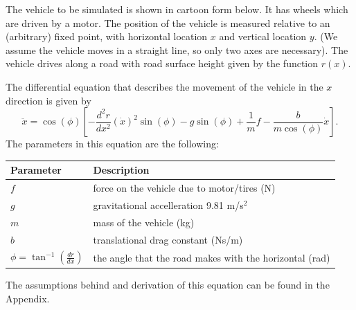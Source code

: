 The vehicle to be simulated is shown in cartoon form below. It has wheels which are driven by a motor.  The position of the vehicle is measured relative to an (arbitrary) fixed point, with horizontal location $x$ and vertical location $y$. (We assume the vehicle moves in a straight line, so only two axes are necessary).  The vehicle drives along a road with road surface height given by the function $r(x)$. 

\begin{center}

\end{center}

The differential equation that describes the movement of the vehicle in the $x$ direction is given by 
\[
\boxed{\ddot{x} = \cos(\phi)\left[ -\frac{d^2r}{dx^{2}}(\dot{x})^2\sin(\phi) - g\sin(\phi) + \frac{1}{m}f - \frac{b}{m\cos(\phi)}\dot{x}\right]}.
\]
The  parameters in this equation are the following:
\begin{center}
\begin{tabular}{l|l}
Parameter & Description\\\hline
$f$ & force on the vehicle due to motor/tires (N)\\
$g$ & gravitational accelleration 9.81 m/s$^2$\\
$m$ & mass of the vehicle (kg)\\
$b$ & translational drag constant (Ns/m)\\
$\phi = \tan^{-1}(\frac{dr}{dx})$ & the angle that the road makes with the horizontal (rad)\\
\end{tabular}
\end{center}
The assumptions behind and derivation of this equation can be found in the Appendix. 

